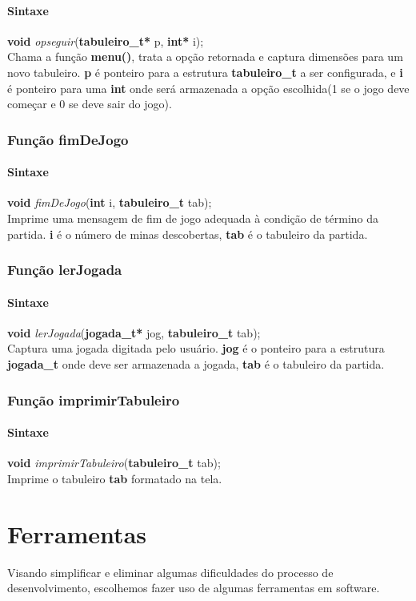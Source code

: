 \documentclass[10pt,a4paper]{report}
\begin{document}
\paragraph{Sintaxe}
\textbf{void} {\it opseguir}(\textbf{tabuleiro\_t*} p, \textbf{int*} i);\\
Chama a função \textbf{menu()}, trata a opção retornada e captura dimensões para um novo tabuleiro. \textbf{p} é ponteiro para a estrutura \textbf{tabuleiro\_t} a ser configurada, e \textbf{i} é ponteiro para uma \textbf{int} onde será armazenada a opção escolhida(1 se o jogo deve começar e 0 se deve sair do jogo).
\subsubsection{Função fimDeJogo}
\paragraph{Sintaxe}
\textbf{void} {\it fimDeJogo}(\textbf{int} i, \textbf{tabuleiro\_t} tab);\\
Imprime uma mensagem de fim de jogo adequada à condição de término da partida. \textbf{i} é o número de minas descobertas, \textbf{tab} é o tabuleiro da partida.
\subsubsection{Função lerJogada}
\paragraph{Sintaxe}
\textbf{void} {\it lerJogada}(\textbf{jogada\_t*} jog, \textbf{tabuleiro\_t} tab);\\
Captura uma jogada digitada pelo usuário. \textbf{jog} é o ponteiro para a estrutura \textbf{jogada\_t} onde deve ser armazenada a jogada, \textbf{tab} é o tabuleiro da partida.
\subsubsection{Função imprimirTabuleiro}
\paragraph{Sintaxe}
\textbf{void} {\it imprimirTabuleiro}(\textbf{tabuleiro\_t} tab);\\
Imprime o tabuleiro \textbf{tab} formatado na tela.
\section{Ferramentas}
Visando simplificar e eliminar algumas dificuldades do processo de desenvolvimento, escolhemos fazer uso de algumas ferramentas em software.
\end{document}
